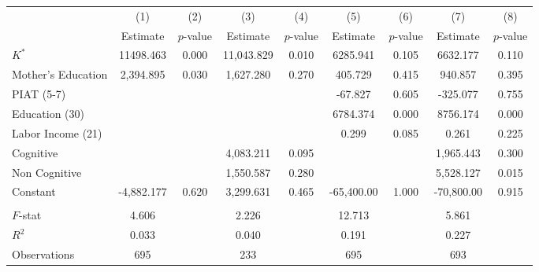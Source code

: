 \begin{tabular}{lcccccccc} \toprule
 & (1) & (2) & (3) & (4) & (5) & (6) & (7) & (8) \\
 & Estimate  & $p$-value  & Estimate  & $p$-value  & Estimate  & $p$-value  & Estimate  & $p$-value  \\  \midrule
$K^\ast$ & 11498.463 &     0.000 & 11,043.829 &     0.010 &  6285.941 &     0.105 &  6632.177 &     0.110 \\
Mother's Education &  2,394.895 &     0.030 &  1,627.280 &     0.270 &   405.729 &     0.415 &   940.857 &     0.395 \\
PIAT (5-7) &         &         &         &         &   -67.827 &     0.605 &  -325.077 &     0.755 \\
Education (30) &         &         &         &         &  6784.374 &     0.000 &  8756.174 &     0.000 \\
Labor Income (21) &         &         &         &         &     0.299 &     0.085 &     0.261 &     0.225 \\
Cognitive &         &         &  4,083.211 &     0.095 &         &         &  1,965.443 &     0.300 \\
Non Cognitive &         &         &  1,550.587 &     0.280 &         &         &  5,528.127 &     0.015 \\
Constant & -4,882.177 &     0.620 &  3,299.631 &     0.465 & -65,400.00 &     1.000 & -70,800.00 &     0.915 \\ \\ \midrule
$F$-stat &     4.606 &         &     2.226 &         &    12.713 &         &     5.861 &        \\
$R^2$ &     0.033 &         &     0.040 &         &     0.191 &         &     0.227 &        \\
Observations &   695 &         &   233 &         &   695  &         &   693  &        \\
\bottomrule \end{tabular}
